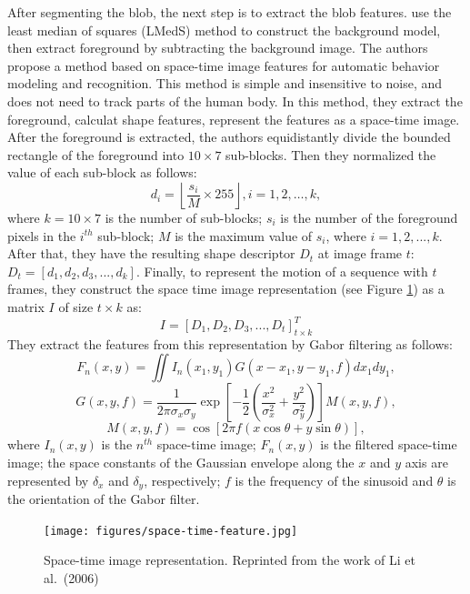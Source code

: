After segmenting the blob, the next step is to extract the blob
features.  use the least median of squares
(LMedS) method to construct the background model, then extract
foreground by subtracting the background image. The authors propose a
method based on space-time image features for automatic behavior
modeling and recognition. This method is simple and insensitive to
noise, and does not need to track parts of the human body. In this
method, they extract the foreground, calculat shape features,
represent the features as a space-time image. After the foreground is
extracted, the authors equidistantly divide the bounded rectangle of
the foreground into $10\times7$ sub-blocks. Then they normalized the
value of each sub-block as follows:
\[
d_i = \left\lfloor {\frac{{s_i}}{{M}}\times255} \right\rfloor, i =
  1,2, \ldots,k,
\]
where $k=10\times7$ is the number of sub-blocks; $s_i$ is the number
of the foreground pixels in the $i^{th}$ sub-block; $M$ is the maximum
value of $s_i$, where $i=1,2,...,k$. After that, they have the
resulting shape descriptor $D_t$ at image frame $t$: $D_t =
[d_1,d_2,d_3,...,d_k]$. Finally, to represent the motion of a sequence
with $t$ frames, they construct the space time image representation
(see Figure \ref{fig:space-time-feature}) as a matrix $I$ of size
$t\times k$ as:
\[
I = [D_1,D_2,D_3,...,D_t]^{T}_{t\times k}
\]
They extract the features from this representation by Gabor filtering as 
follows:
\[
F_n (x,y) = \iint {I_n (x_1 ,y_1 )G(x - x_1 ,y - y_1 ,f)dx_1dy_1},
\]
\[
G(x,y,f) = \frac{1}{{2\pi \sigma _x \sigma _y }}\exp \left[ {
- \frac{1}{2}\left( {\frac{{x^2 }}{{\sigma _x^2 }} + \frac{{y^2
}}{{\sigma _y^2 }}} \right)} \right]M(x,y,f),
\]
\[
M(x,y,f) = \cos \left[ {2\pi f(x\cos \theta + y\sin \theta)} \right],
\]
where $I_n(x,y)$ is the $n^{th}$ space-time image; $F_n(x,y)$ is the filtered 
space-time image; the space constants of the Gaussian envelope along the $x$ 
and $y$ axis are represented by $\delta _x$ and $\delta _y$, respectively; $f$ 
is the frequency of the sinusoid and $\theta$ is the orientation of the Gabor 
filter.

\begin{figure}[t]
  \centering
  \texttt{[image: figures/space-time-feature.jpg]}
  \caption[Space-time image representation]{Space-time image
  representation. Reprinted from the work of Li et al.\ (2006)}
  \label{fig:space-time-feature}
\end{figure}

